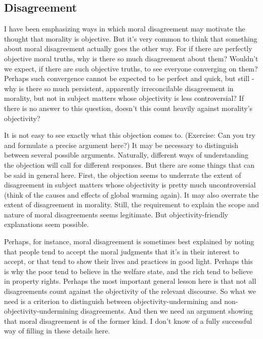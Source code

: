 \subsection{Disagreement} 
I have been emphasizing ways in which moral disagreement may motivate the thought 
that morality is objective. But it's very common to think that something about moral 
disagreement actually goes the other way. For if there are perfectly objective moral 
truths, why is there so much disagreement about them? Wouldn't we expect, if there 
are such objective truths, to see everyone converging on them? Perhaps such 
convergence cannot be expected to be perfect and quick, but still - why is there so much 
persistent, apparently irreconcilable disagreement in morality, but not in subject 
matters whose objectivity is less controversial? If there is no answer to this question, 
doesn't this count heavily against morality's objectivity? 

It is not easy to see exactly what this objection comes to. (Exercise: Can you try 
and formulate a precise argument here?) It may be necessary to distinguish between 
several possible arguments. Naturally, different ways of understanding the objection 
will call for different responses. But there are some things that can be said in general 
here. First, the objection seems to underrate the extent of disagreement in subject 
matters whose objectivity is pretty much uncontroversial (think of the causes and 
effects of global warming again). It may also overrate the extent of disagreement in 
morality. Still, the requirement to explain the scope and nature of moral disagreements 
seems legitimate. But objectivity-friendly explanations seem possible.  

Perhaps, for instance, moral disagreement is sometimes best explained by noting 
that people tend to accept the moral judgments that it's in their interest to accept, or 
that tend to show their lives and practices in good light. Perhaps this is why the poor 
tend to believe in the welfare state, and the rich tend to believe in property rights.  
Perhaps the most important general lesson here is that not all disagreements 
count against the objectivity of the relevant discourse. So what we need is a criterion to 
distinguish between objectivity-undermining and non-objectivity-undermining 
disagreements. And then we need an argument showing that moral disagreement is of 
the former kind. I don't know of a fully successful way of filling in these details here.  

